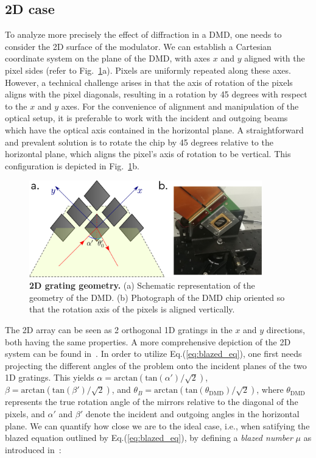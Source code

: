 \documentclass[12pt]{iopart}
\begin{document}
\subsection{2D case}

To analyze more precisely the effect of diffraction in a DMD,
one needs to consider the 2D surface of the modulator.
We can establish a Cartesian coordinate system on the plane of the DMD,
with axes $x$ and $y$ aligned with the pixel sides
(refer to Fig.~\ref{fig:2d_geom}a).
Pixels are uniformly repeated along these axes.
However, a technical challenge arises
in that the axis of rotation of the pixels
aligns with the pixel diagonals,
resulting in a rotation by 45 degrees with respect to the $x$ and $y$ axes.
For the convenience of alignment and manipulation of the optical setup,
it is preferable to work with the incident and outgoing beams
which have the optical axis contained in the horizontal plane.
A straightforward and prevalent solution is to rotate the chip by 45 degrees
relative to the horizontal plane,
which aligns the pixel’s axis of rotation to be vertical.
This configuration is depicted in Fig.~\ref{fig:2d_geom}b.



\begin{figure}
  \centering
  \includegraphics[width = 0.9\textwidth]{images/dmd_45.pdf}
  \caption{
    \textbf{2D grating geometry.}
    (a) Schematic representation of the geometry of the DMD.
    (b) Photograph of the DMD chip oriented so that the rotation axis of the pixels
    is aligned vertically.
  }
  \label{fig:2d_geom}
\end{figure}

The 2D array can be seen as 2 orthogonal 1D gratings in the $x$ and $y$ directions,
both having the same properties.
A more comprehensive depiction of the 2D system can be found in~\cite{Scholes2019structured}.
In order to utilize Eq.(\ref{eq:blazed_eq}),
one first needs projecting
the different angles of the problem onto the incident planes
of the two 1D gratings.
This yields
$\alpha = \text{arctan}\left(\text{tan}(\alpha')/\sqrt{2}\right)$,
$\beta = \text{arctan}\left(\text{tan}(\beta')/\sqrt{2}\right)$,
and $\theta_B = \text{arctan}\left(\text{tan}(\theta_\text{DMD})/\sqrt{2}\right)$,
where $\theta_\text{DMD}$ represents the true rotation angle of the mirrors relative to the diagonal of the pixels,
and $\alpha'$ and $\beta'$ denote the incident and outgoing angles in the horizontal plane.
We can quantify how close we are to the ideal case,
i.e., when satifying the blazed equation outlined by Eq.(\ref{eq:blazed_eq}),
by defining a {\em blazed number} $\mu$ as introduced in~\cite{WFSnet_diffraction}:
\end{document}
